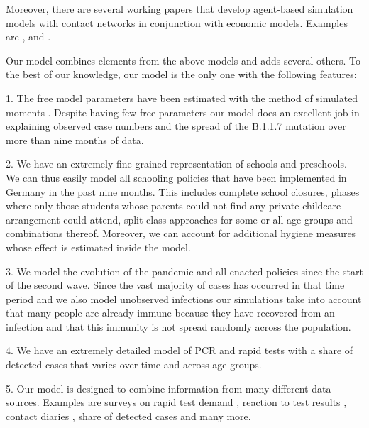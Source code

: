Moreover, there are several working papers that develop agent-based simulation models
with contact networks in conjunction with economic models. Examples are
\citet{Basurto2020}, \citet{DelliGatti2020} and \citet{Mellacher2020}.

Our model combines elements from the above models and adds several others. To the best
of our knowledge, our model is the only one with the following features:

1. The free model parameters have been estimated with the method of simulated moments
\citep{McFadden1989}. Despite having few free parameters our model does an excellent
job in explaining observed case numbers and the spread of the B.1.1.7 mutation over
more than nine months of data.

2. We have an extremely fine grained representation of schools and preschools. We can
thus easily model all schooling policies that have been implemented in Germany in the
past nine months. This includes complete school closures, phases where only those
students whose parents could not find any private childcare arrangement could attend,
split class approaches for some or all age groups and combinations thereof. Moreover,
we can account for additional hygiene measures whose effect is estimated inside the
model.

3. We model the evolution of the pandemic and all enacted policies since the start of
the second wave. Since the vast majority of cases has occurred in that time period
and we also model unobserved infections our simulations take into account that many
people are already immune because they have recovered from an infection and that this
immunity is not spread randomly across the population.

4. We have an extremely detailed model of PCR and rapid tests with a share of detected
cases that varies over time and across age groups.

5. Our model is designed to combine information from many different data sources.
Examples are surveys on rapid test demand \citep{Betsch2021}, reaction to test
results \citep{Betsch2021}, contact diaries \citep{Mossong2008}, share of detected
cases \citep{Dunkelzifferradar2020} and many more.
